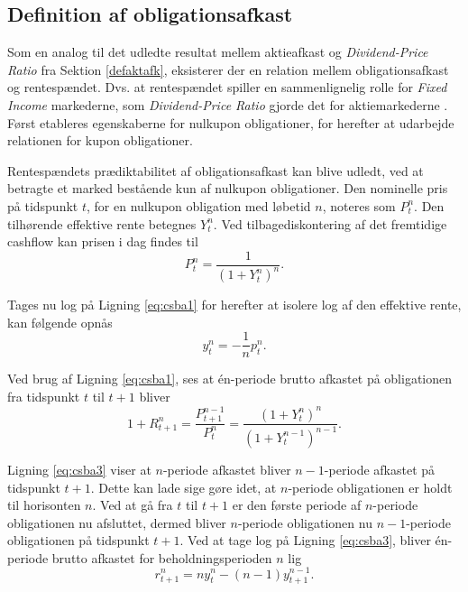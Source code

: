 \documentclass[
  a4paper,
  oneside]{memoir}
\begin{document}
\hypertarget{defafobl}{%
\subsection{Definition af obligationsafkast}\label{defafobl}}

Som en analog til det udledte resultat mellem aktieafkast og \emph{Dividend-Price Ratio} fra Sektion \ref{defaktafk}, eksisterer der en relation mellem obligationsafkast og rentespændet. Dvs. at rentespændet spiller en sammenlignelig rolle for \emph{Fixed Income} markederne, som \emph{Dividend-Price Ratio} gjorde det for aktiemarkederne \citep{Campbell1997}. Først etableres egenskaberne for nulkupon obligationer, for herefter at udarbejde relationen for kupon obligationer.

Rentespændets prædiktabilitet af obligationsafkast kan blive udledt, ved at betragte et marked bestående kun af nulkupon obligationer. Den nominelle pris på tidspunkt \(t\), for en nulkupon obligation med løbetid \(n\), noteres som \(P_t^n\). Den tilhørende effektive rente betegnes \(Y_t^n\). Ved tilbagediskontering af det fremtidige cashflow kan prisen i dag findes til
\begin{equation}
P_t^n=\frac{1}{(1+Y_t^n)^n}. \label{eq:csba1}
\end{equation}

Tages nu log på Ligning \eqref{eq:csba1} for herefter at isolere log af den effektive rente, kan følgende opnås
\begin{equation}
y_t^n=-\frac{1}{n}p_t^n. \label{eq:csba2}
\end{equation}

Ved brug af Ligning \eqref{eq:csba1}, ses at én-periode brutto afkastet på obligationen fra tidspunkt \(t\) til \(t+1\) bliver
\begin{equation}
1+R_{t+1}^n=\frac{P_{t+1}^{n-1}}{P_t^n}=\frac{(1+Y_t^n)^n}{(1+Y_t^{n-1})^{n-1}}. \label{eq:csba3}
\end{equation}

Ligning \eqref{eq:csba3} viser at \(n\)-periode afkastet bliver \(n-1\)-periode afkastet på tidspunkt \(t+1\). Dette kan lade sige gøre idet, at \(n\)-periode obligationen er holdt til horisonten \(n\). Ved at gå fra \(t\) til \(t+1\) er den første periode af \(n\)-periode obligationen nu afsluttet, dermed bliver \(n\)-periode obligationen nu \(n-1\)-periode obligationen på tidspunkt \(t+1\). Ved at tage log på Ligning \eqref{eq:csba3}, bliver én-periode brutto afkastet for beholdningsperioden \(n\) lig
\begin{equation}
r_{t+1}^n=n y_t^n - (n-1) y_{t+1}^{n-1}. \label{eq:csba4}
\end{equation}
\end{document}
